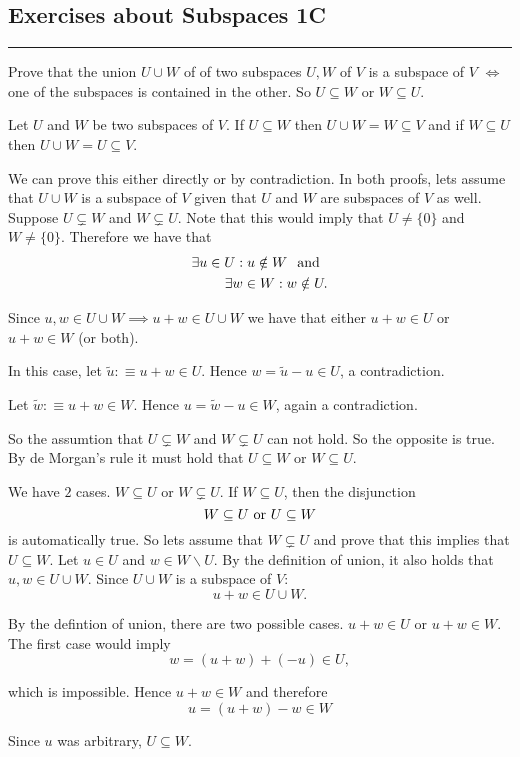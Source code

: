 \subsection*{Exercises about Subspaces 1C}
\hrule
\phantom{.}

\setcounter{xrcs}{11}
\begin{xrcs}
  Prove that the union $U \cup W$ of of two subspaces $U, W$ of $V$ is a subspace of $V$ $\iff$ one of the subspaces is contained in the other. So $U\subseteq W$ or $W \subseteq U$.
\end{xrcs}
\begin{prf}
   Let $U$ and $W$ be two subspaces of $V$. If $U \subseteq W$ then $U \cup W = W \subseteq V$ and if $W \subseteq U$ then $U \cup W = U \subseteq V$.

   We can prove this either directly or by contradiction. In both proofs, lets assume that $U \cup W$ is a subspace of $V$ given that $U$ and $W$ are subspaces of $V$ as well. \\
   Suppose $U \subsetneq W$ and $W \subsetneq U$. Note that this would imply that $U \neq \{0\}$ and $W \neq \{0\}$. Therefore we have that
  \[
  \begin{aligned}
    \exists u \in U: u \notin W \;\;\, \text{and}\;\; \\
    \exists w \in W: w \notin U.
  \end{aligned}
  \]

  Since $u,w \in U \cup W \implies u+w \in U \cup W $ we have that either $u+w \in U$ or $u+w \in W$ (or both).
  \begin{description}
    \item{} In this case, let $\widetilde u :\equiv u + w \in U$. Hence $w = \widetilde{u} - u \in U$, a contradiction.
    \item{} Let $\widetilde w :\equiv u + w \in W$. Hence $u = \widetilde{w} - u \in W$, again a contradiction.
  \end{description}

  So the assumtion that $U \subsetneq W$ and $W \subsetneq U$ can not hold. So the opposite is true. By de Morgan's rule it must hold that $U \subseteq W$ or $W \subseteq U$.

   We have $2$ cases. $W \subseteq U$ or $W \subsetneq U$. If $W \subseteq U$, then the disjunction \[
  W \subseteq U $ or $ U \subseteq W
  \]
  is automatically true. So lets assume that $W \subsetneq U$ and prove that this implies that $U \subseteq W$.
  Let $u \in U$ and $w \in W \backslash U$. By the definition of union, it also holds that $u,w \in U \cup W$. Since $U \cup W$ is a subspace of $V$:
  \[
    u+w \in U \cup W.
  \]

  By the defintion of union, there are two possible cases. $u+w \in U$ or $u+w \in W$. The first case would imply
  \[
    w = (u+w) + (-u) \in U,
  \]

  which is impossible. Hence $u+w \in W$ and therefore
  \[
    u= (u+w) -w \in W
  \]

  Since $u$ was arbitrary, $U \subseteq W$.
\end{prf}